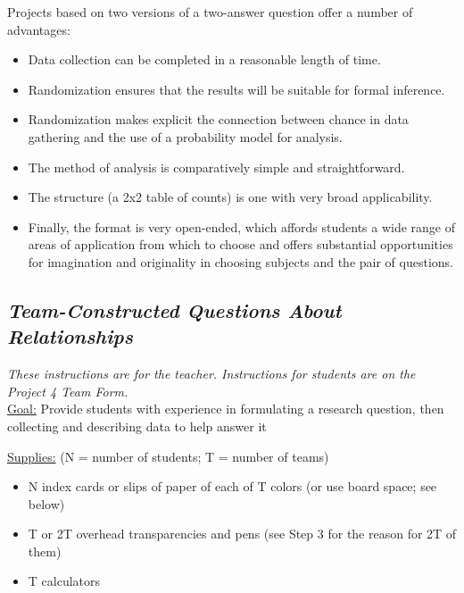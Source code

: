Projects based on two versions of a two-answer question offer a number of advantages:  
\renewcommand{\labelitemi}{$\filledsquare$}
\begin{itemize}[leftmargin=1cm, itemsep=.2em]
\item Data collection can be completed in a reasonable length of time.
\item Randomization ensures that the results will be suitable for formal inference.
\item Randomization makes explicit the connection between chance in data gathering and the use of a probability model for analysis.
\item The method of analysis is comparatively simple and straightforward.
\item The structure (a 2x2 table of counts) is one with very broad applicability.
\item Finally, the format is very open-ended, which affords students a wide range of areas of application from which to choose and offers substantial opportunities for imagination and originality in choosing subjects and the pair of questions.
\end{itemize}

\newpage

\subsection{\textbf{\textit{Team-Constructed Questions About Relationships}}}

\textit{These instructions are for the teacher. Instructions for students are on the Project 4 Team Form.}\\
\vspace{10pt}
\noindent\underline{Goal:} Provide students with experience in formulating a research question, then collecting and describing data to help answer it\\
\vspace{10pt}

\noindent\underline{Supplies:} (N = number of students; T = number of teams)
\begin{itemize}[leftmargin=1cm, itemsep=.2em]
\item N index cards or slips of paper of each of T colors (or use board space; see below)
\item T or 2T overhead transparencies and pens (see Step 3 for the reason for 2T of them)
\item T calculators
\end{itemize}

